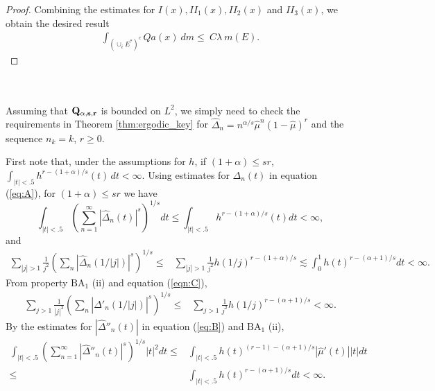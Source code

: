 \documentclass[11pt]{amsart}
\theoremstyle{definition}
\theoremstyle{remark}
\begin{document}
\begin{proof}
Combining the estimates for $I(x),II_{1}(x), II_{2}(x)$ and $II_{3}(x)$, we obtain the desired result
\begin{align*} 
\int_{(\cup_i E^*)^c } Qa(x)\ dm
\le  \ C  \lambda \ m(E). %
\end{align*}


\end{proof} 





\medskip
{}\\

\\
Assuming that ${\bf Q_{{\alpha,s,r}}}$ is bounded on $L^2$,
 we simply need to check the requirements in Theorem \ref{thm:ergodic_key} for $\hat \Delta_n=n^{\alpha/s} \hat\mu^n(1-\hat\mu)^{r}$ and the sequence $n_k=k$, $r\ge 0$.


First  note that, under the assumptions for $h$,   if $(1+\alpha)\le sr$,
$\int_{|t|<.5}  
h^{r-(1+\alpha)/s}(t) \, dt<\infty.$
%
Using estimates for $\Delta_n(t)$ in equation (\ref{eq:A}),  for $(1+\alpha)\le sr$ we have
\[\int_{|t|<.5}   \left(\sum_{n=1}^{\infty}   |\hat\Delta_n(t)|^s \right)^{1/s}  dt\le 
\int_{|t|<.5}  h^{r-(1+\alpha)/s}(t)dt <\infty,\]
and
\begin{align*}
\sum_{|j|>1}  \frac{1}{j^2}
\left(\sum_n  
 \left| \hat\Delta_n(1/|j|) \right|^s \right)^{1/s} 
\le &   \sum_{|j|>1}
 \frac 1{j^2} h(1/j)^{r-(1+\alpha)/s}
 \lesssim  \int_0^1 h(t)^{r-(\alpha+1)/s}dt <\infty.
 \end{align*}
% 
 From property $\text{BA}_1$ (ii) and equation (\ref{eqn:C}),
\begin{align*}
\sum_{j>1} \frac{1}{|j|^3} \left(\sum_n 
 \left| \hat\Delta'_n(1/|j|) \right|^s \right)^{1/s}  \le &
 \sum_{j>1}
 \frac 1{j^2} h(1/j)^{r-(\alpha+1)/s} <\infty.
 \end{align*}
%
By the estimates  for $|\hat\Delta''_n(t)|$ in equation (\ref{eq:B}) and $\text{BA}_1$ (ii),
\begin{align*}
\int_{|t|<.5} \left(\sum_{n=1}^{\infty} |\hat\Delta''_n(t)|^s\right)^{1/s} |t|^2 dt \le &
\int_{|t|<.5}  h(t)^{(r-1)-(\alpha+1)/s}|\hat\mu'(t)| |t| dt \\
\le & \int_{|t|<.5}  h(t)^{r-(\alpha+1)/s}dt <\infty .
\end{align*}
\end{document}
